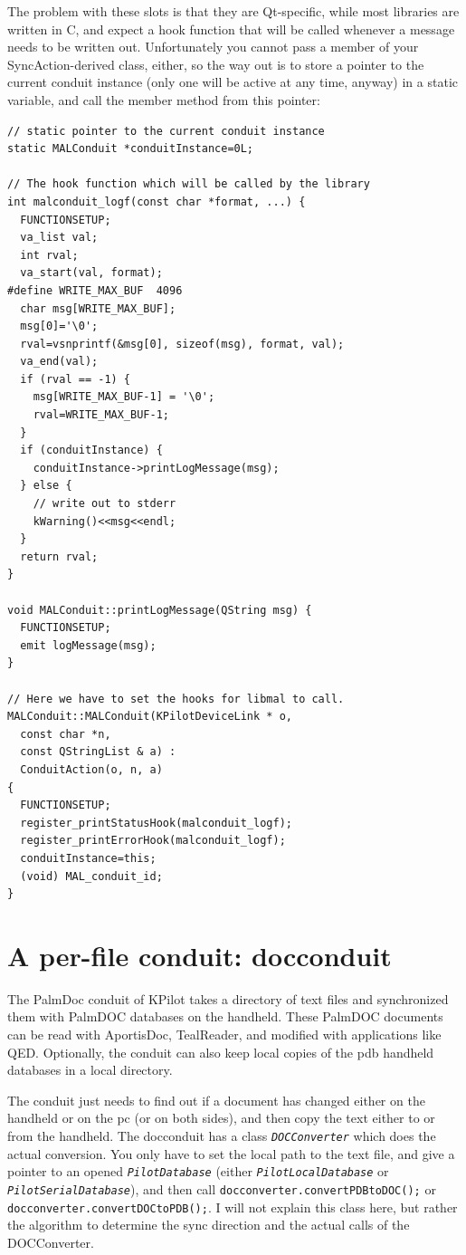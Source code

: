 \documentclass[10pt,a4paper]{article}
\newcommand{\code}[1]{{\small\texttt{#1}}}
\newcommand{\class}[1]{{\small\em\texttt{#1}}}
\begin{document}
The problem with these slots is that they are Qt-specific, while most libraries are written in C, and expect a hook function that will be called whenever a message needs to be written out. Unfortunately you cannot pass a member of your SyncAction-derived class, either, so the way out is to store a pointer to the current conduit instance (only one will be active at any time, anyway) in a static variable, and call the member method from this pointer:

{\footnotesize
\begin{verbatim}
// static pointer to the current conduit instance
static MALConduit *conduitInstance=0L;

// The hook function which will be called by the library
int malconduit_logf(const char *format, ...) {
  FUNCTIONSETUP;
  va_list val;
  int rval;
  va_start(val, format);
#define WRITE_MAX_BUF  4096
  char msg[WRITE_MAX_BUF];
  msg[0]='\0';
  rval=vsnprintf(&msg[0], sizeof(msg), format, val);
  va_end(val);
  if (rval == -1) {
    msg[WRITE_MAX_BUF-1] = '\0';
    rval=WRITE_MAX_BUF-1;
  }
  if (conduitInstance) {
    conduitInstance->printLogMessage(msg);
  } else {
    // write out to stderr
    kWarning()<<msg<<endl;
  }
  return rval;
}

void MALConduit::printLogMessage(QString msg) {
  FUNCTIONSETUP;
  emit logMessage(msg);
}

// Here we have to set the hooks for libmal to call.
MALConduit::MALConduit(KPilotDeviceLink * o,
  const char *n, 
  const QStringList & a) :
  ConduitAction(o, n, a)
{
  FUNCTIONSETUP;
  register_printStatusHook(malconduit_logf);
  register_printErrorHook(malconduit_logf);
  conduitInstance=this;
  (void) MAL_conduit_id;
}
\end{verbatim}
}



\section{A per-file conduit: docconduit}\label{SectionDatabasesConduit}

The PalmDoc conduit of KPilot takes a directory of text files and synchronized them with PalmDOC databases on the handheld. These PalmDOC documents can be read with AportisDoc, TealReader, and modified with applications like QED. Optionally, the conduit can also keep local copies of the pdb handheld databases in a local directory.

The conduit just needs to find out if a document has changed either on the handheld or on the pc (or on both sides), and then copy the text either to or from the handheld. The docconduit has a class \class{DOCConverter} which does the actual conversion. You only have to set the local path to the text file, and give a pointer to an opened \class{PilotDatabase} (either \class{PilotLocalDatabase} or \class{PilotSerialDatabase}), and then call 
\code{docconverter.convertPDBtoDOC();} or \code{docconverter.convertDOCtoPDB();}. I will not explain this class here, but rather the algorithm to determine the sync direction and the actual calls of the DOCConverter. 
\end{document}
